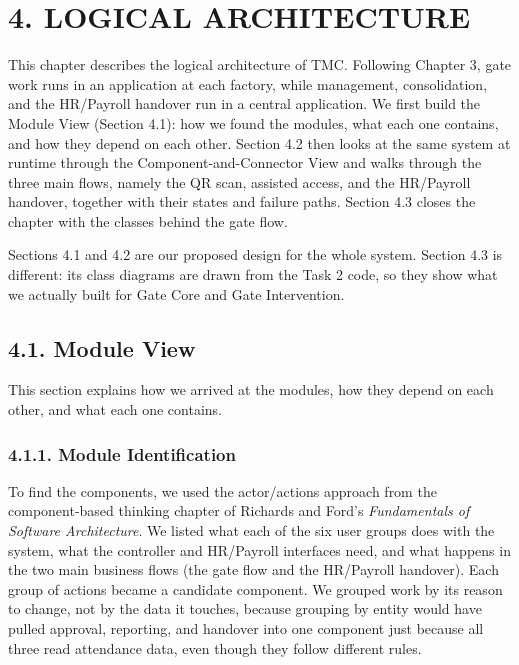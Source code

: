 \section*{4. LOGICAL ARCHITECTURE}

{}


This chapter describes the logical architecture of TMC. Following Chapter 3, gate work runs in an application at each factory, while management, consolidation, and the HR/Payroll handover run in a central application. We first build the Module View (Section 4.1): how we found the modules, what each one contains, and how they depend on each other. Section 4.2 then looks at the same system at runtime through the Component-and-Connector View and walks through the three main flows, namely the QR scan, assisted access, and the HR/Payroll handover, together with their states and failure paths. Section 4.3 closes the chapter with the classes behind the gate flow.

Sections 4.1 and 4.2 are our proposed design for the whole system. Section 4.3 is different: its class diagrams are drawn from the Task 2 code, so they show what we actually built for Gate Core and Gate Intervention.

\subsection*{4.1. Module View}

{}

This section explains how we arrived at the modules, how they depend on each other, and what each one contains.

\subsubsection*{4.1.1. Module Identification}

{}

To find the components, we used the actor/actions approach from the component-based thinking chapter of Richards and Ford's \textit{Fundamentals of Software Architecture}. We listed what each of the six user groups does with the system, what the controller and HR/Payroll interfaces need, and what happens in the two main business flows (the gate flow and the HR/Payroll handover). Each group of actions became a candidate component. We grouped work by its reason to change, not by the data it touches, because grouping by entity would have pulled approval, reporting, and handover into one component just because all three read attendance data, even though they follow different rules.

